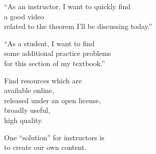 \documentclass{chalkboard}
\begin{document}
\begin{frame}
  \huge 

  ``As an instructor, I want to quickly find \\
  \quad a good video \\
  \quad\quad related to the theorem I'll be discussing today.''

  \vfill

  ``As a student, I want to find \\
  \quad some additional practice problems \\
  \quad\quad for this section of my textbook.''
\end{frame}

\begin{frame}
  \huge

  Find resources which are \\
  \quad available online, \\
  \quad released under an open license, \\
  \quad broadly useful, \\
  \quad high quality.

  \vfill

  One ``solution'' for instructors is \\
  \quad to create our own content.

\end{frame}


\begin{frame}[nofills]
\vfill

 \\[24pt]

\begin{center}\end{center}


\vfill

\end{frame}

%
%
\begin{frame}
\end{frame}
\end{document}
